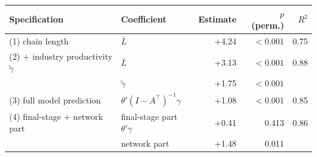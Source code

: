 \begin{tabular}{llrrr}
\toprule
Specification & Coefficient & Estimate & $p$ (perm.) & $R^2$ \\
\midrule
(1) chain length & $\bar L$ & +4.24 & $<0.001$ & 0.75 \\
(2) $+$ industry productivity $\tilde\gamma$ & $\bar L$ & +3.13 & $<0.001$ & 0.88 \\
 & $\tilde\gamma$ & +1.75 & $<0.001$ &  \\
(3) full model prediction & $\theta'(I-A^\top)^{-1}\gamma$ & +1.08 & $<0.001$ & 0.85 \\
(4) final-stage $+$ network part & final-stage part $\theta'\gamma$ & +0.41 & 0.413 & 0.86 \\
 & network part & +1.48 & 0.011 &  \\
\bottomrule
\end{tabular}
